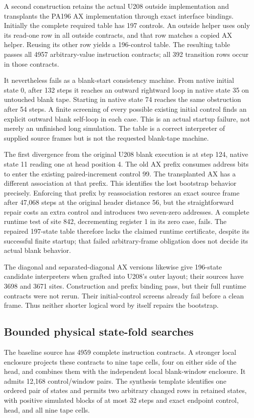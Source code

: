 A second construction retains the actual U208 outside implementation and transplants the PA196 AX implementation through exact interface bindings. Initially the complete required table has 197 controls. An outside helper uses only its read-one row in all outside contracts, and that row matches a copied AX helper. Reusing its other row yields a 196-control table. The resulting table passes all 4957 arbitrary-value instruction contracts; all 392 transition rows occur in those contracts.

It nevertheless fails as a blank-start consistency machine. From native initial state 0, after 132 steps it reaches an outward rightward loop in native state 35 on untouched blank tape. Starting in native state 74 reaches the same obstruction after 54 steps. A finite screening of every possible existing initial control finds an explicit outward blank self-loop in each case. This is an actual startup failure, not merely an unfinished long simulation. The table is a correct interpreter of supplied source frames but is not the requested blank-tape machine.

The first divergence from the original U208 blank execution is at step 124, native state 11 reading one at head position 4. The old AX prefix consumes address bits  to enter the existing paired-increment control 99. The transplanted AX has a different association at that prefix. This identifies the lost bootstrap behavior precisely. Enforcing that prefix by reassociation restores an exact source frame after 47,068 steps at the original header distance 56, but the straightforward repair costs an extra control and introduces two seven-zero addresses. A complete runtime test of site 842, decrementing register 1 in its zero case, fails. The repaired 197-state table therefore lacks the claimed runtime certificate, despite its successful finite startup; that failed arbitrary-frame obligation does not decide its actual blank behavior.

The diagonal and separated-diagonal AX versions likewise give 196-state candidate interpreters when grafted into U208's outer layout; their sources have 3698 and 3671 sites. Construction and prefix binding pass, but their full runtime contracts were not rerun. Their initial-control screens already fail before a clean frame. Thus neither shorter logical word by itself repairs the bootstrap.

\subsection{Bounded physical state-fold searches}
The baseline source has 4959 complete instruction contracts. A stronger local enclosure projects these contracts to nine tape cells, four on either side of the head, and combines them with the independent local blank-window enclosure. It admits 12,168 control/window pairs. The synthesis template identifies one ordered pair of states and permits two arbitrary changed rows in retained states, with positive simulated blocks of at most 32 steps and exact endpoint control, head, and all nine tape cells.

